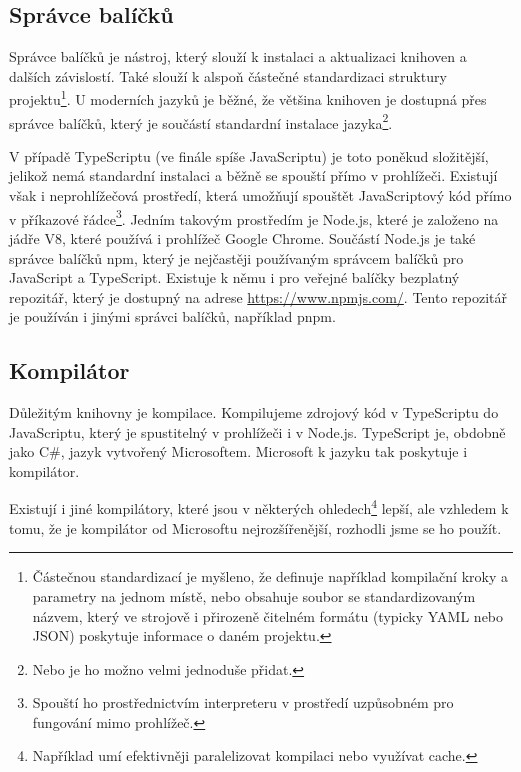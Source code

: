 \subsection{Správce balíčků}
\label{subsec:package-manager}

Správce balíčků je nástroj, který slouží k instalaci a aktualizaci knihoven a dalších závislostí.
Také slouží k alspoň částečné standardizaci struktury projektu\footnote{Částečnou standardizací je myšleno, že definuje například kompilační kroky a parametry na jednom místě, nebo obsahuje soubor se standardizovaným názvem, který ve strojově i přirozeně čitelném formátu (typicky YAML nebo JSON) poskytuje informace o daném projektu.}. 
U moderních jazyků je běžné, že většina knihoven je dostupná přes správce balíčků, který je součástí standardní instalace jazyka\footnote{Nebo je ho možno velmi jednoduše přidat.}\cite{npm:docs,Rust:cargo,golang:pkg,python:pip}.

V případě TypeScriptu (ve finále spíše JavaScriptu) je toto poněkud složitější, jelikož nemá standardní instalaci a běžně se spouští přímo v prohlížeči.
Existují však i neprohlížečová prostředí, která umožňují spouštět JavaScriptový kód přímo v příkazové řádce\footnote{Spouští ho prostřednictvím interpreteru v prostředí uzpůsobném pro fungování mimo prohlížeč.}. 
Jedním takovým prostředím je Node.js, které je založeno na jádře V8\cite{node:v8}, které používá i prohlížeč Google Chrome\cite{v8}.
Součástí Node.js je také správce balíčků npm\cite{npm:docs,geometryjs:wiki:technologies}, který je nejčastěji používaným správcem balíčků pro JavaScript a TypeScript. 
Existuje k němu i pro veřejné balíčky bezplatný repozitář, který je dostupný na adrese \url{https://www.npmjs.com/}.
Tento repozitář je používán i jinými správci balíčků, například pnpm\cite{pnpm}.

\subsection{Kompilátor}
\label{subsec:compiler}

Důležitým  knihovny je kompilace. 
Kompilujeme zdrojový kód v TypeScriptu do JavaScriptu, který je spustitelný v prohlížeči i v Node.js. 
TypeScript je, obdobně jako C\#, jazyk vytvořený Microsoftem\cite{TypeScript}.
Microsoft k jazyku tak poskytuje i kompilátor.

Existují i jiné kompilátory, které jsou v některých ohledech\footnote{Například umí efektivněji paralelizovat kompilaci nebo využívat cache.} lepší, ale vzhledem k tomu, že je kompilátor od Microsoftu nejrozšířenější, rozhodli jsme se ho použít.

